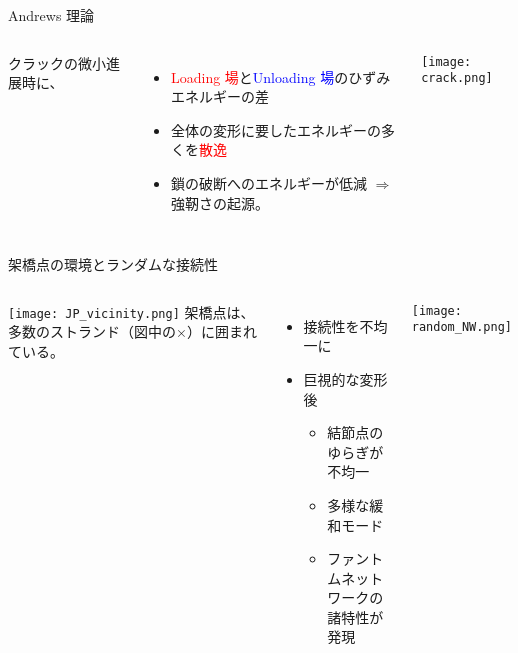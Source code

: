 \begin{columns}[totalwidth=.9\linewidth]
    \column{\textwidth}
    \begin{itembox}[l]{Andrews 理論\cite{andrews}}
        \begin{columns}[totalwidth=\textwidth]
                クラックの微小進展時に、
                \begin{itemize}
                    \item
                    \textcolor{red}{Loading 場}と\textcolor{blue}{Unloading 場}のひずみエネルギーの差
                    \item
                    全体の変形に要したエネルギーの多くを\textcolor{red}{散逸}
                    \item
                    鎖の破断へのエネルギーが低減 $\Rightarrow$ \alert{強靭さの起源。}
                \end{itemize}	
                \texttt{[image: crack.png]}     
        \end{columns}
    \end{itembox}
\end{columns}

\begin{columns}[totalwidth=.9\linewidth]
    \column{\textwidth}
    \begin{itembox}[l]{架橋点の環境とランダムな接続性}
        \begin{columns}[totalwidth=\textwidth]
                \texttt{[image: JP\_vicinity.png]}
                架橋点は、\alert{多数のストランド（図中の×）}に囲まれている。
                \begin{itemize}
                    \item 接続性を不均一に
                    \item 巨視的な変形後
                        \begin{itemize}
                            \item \alert{結節点のゆらぎが不均一}
                            \item 多様な緩和モード
                        \item ファントムネットワークの\\諸特性が発現
                        \end{itemize}
                \end{itemize}
				\texttt{[image: random\_NW.png]}
		\end{columns}
    \end{itembox}
\end{columns}